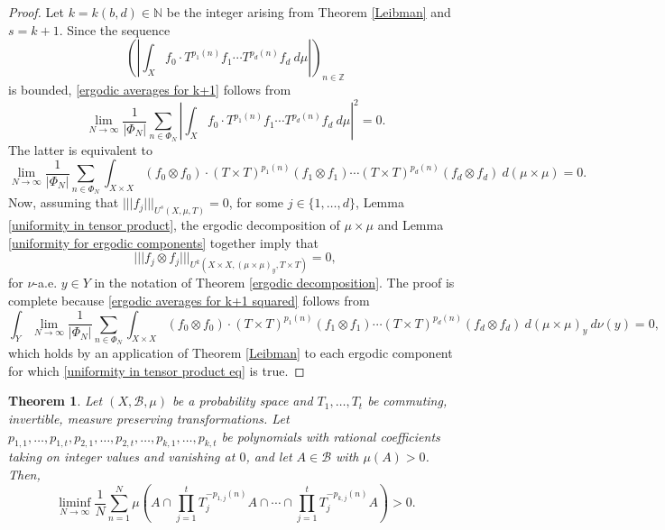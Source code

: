 \documentclass[reqno]{amsart}
\def\Z{{\mathbb Z}}
\def\N{{\mathbb N}}
\newcommand{\nnorm}[1]{\lvert\!|\!| #1|\!|\!\rvert}
\newtheorem{theorem}{Theorem}[section]
\theoremstyle{definition}
\theoremstyle{remark}
\def\N{{\mathbb N}}
\begin{document}
\begin{proof}
Let $k=k(b,d)\in \N$ be the integer arising from Theorem \ref{Leibman} and $s=k+1$. 
Since the sequence 
$$\left( \left| \int_{X} f_0 \cdot T^{p_1(n)}f_1 \cdots T^{p_d(n)}f_d\ d\mu \right| \right)_{n\in \Z}$$
is bounded, \eqref{ergodic averages for k+1} follows from 
$$\lim_{N\to \infty} \frac{1}{|\Phi_N|}\sum_{n\in \Phi_N} \left| \int_{X} f_0 \cdot T^{p_1(n)}f_1 \cdots T^{p_d(n)}f_d\ d\mu \right|^2 =0. $$
The latter is equivalent to 
\begin{equation}\label{ergodic averages for k+1 squared}
\lim_{N\to \infty} \frac{1}{|\Phi_N|}\sum_{n\in \Phi_N} \int_{X\times X} (f_0\otimes f_0) \cdot (T\times T)^{p_1(n)}(f_1\otimes f_1) \cdots (T\times T)^{p_d(n)}(f_d\otimes f_d)\ d(\mu\times \mu) =0.     
\end{equation}
Now, assuming that $\nnorm{f_j}_{U^{s}(X,\mu,T)}=0$, for some $j\in \{1,\ldots,d\}$, Lemma \ref{uniformity in tensor product}, the ergodic decomposition of $\mu \times \mu$ and Lemma \ref{uniformity for ergodic components} together imply that 
\begin{equation}\label{uniformity in tensor product eq}
\nnorm{f_j\otimes f_j}_{U^k(X\times X,(\mu\times \mu)_y, T\times T)}=0,    
\end{equation}
for $\nu$-a.e. $y\in Y$ in the notation of Theorem \ref{ergodic decomposition}. The proof is complete because \eqref{ergodic averages for k+1 squared} follows from
$$\int_Y \lim_{N\to \infty} \frac{1}{|\Phi_N|}\sum_{n\in \Phi_N} \int_{X\times X} (f_0\otimes f_0) \cdot (T\times T)^{p_1(n)}(f_1\otimes f_1) \cdots (T\times T)^{p_d(n)}(f_d\otimes f_d)\ d(\mu\times \mu)_y\ d\nu(y) = 0,$$
which holds by an application of Theorem \ref{Leibman} to each ergodic component for which \eqref{uniformity in tensor product eq} is true. 
\end{proof}



\begin{theorem}{{\cite[Theorem A]{Bergelson_Leibman96}}}\label{Bergelson-Leibman}
Let $(X,\mathcal{B},\mu)$ be a probability space and $T_1,\ldots,T_t$ be commuting, invertible, measure preserving transformations. Let $p_{1,1},\ldots,p_{1,t},p_{2,1},\ldots,p_{2,t},\ldots,p_{k,1},\ldots,p_{k,t}$ be polynomials with rational coefficients taking on integer values and vanishing at $0$, and let $A\in \mathcal{B}$ with $\mu(A)>0$. Then, 
$$\liminf_{N\to \infty}\frac{1}{N}\sum_{n=1}^N \mu\left( A \cap \prod_{j=1}^t T_j^{-p_{1,j}(n)}A\cap \cdots \cap \prod_{j=1}^t T_j^{-p_{k,j}(n)}A  \right)>0. $$
\end{theorem}
\end{document}
